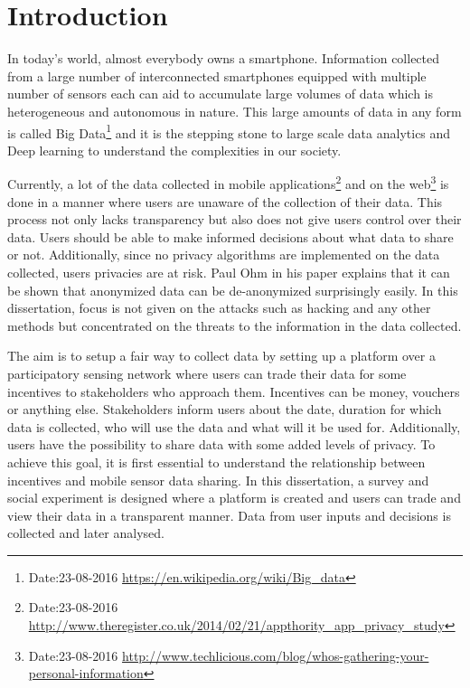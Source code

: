 \chapter{Introduction}

In today's world, almost everybody owns a smartphone. Information collected from a large number of interconnected smartphones equipped with
multiple number of sensors each can aid to accumulate large volumes of data which is heterogeneous and autonomous in nature. This large amounts of data in any form is called Big Data\footnote{Date:23-08-2016 \url{https://en.wikipedia.org/wiki/Big\_data}} and it
is the stepping stone to large scale data analytics and Deep learning to understand the complexities in our society. 

Currently, a lot of the data collected in mobile applications\footnote{Date:23-08-2016 \url{http://www.theregister.co.uk/2014/02/21/appthority\_app_privacy\_study}} and on the web\footnote{Date:23-08-2016 \url{http://www.techlicious.com/blog/whos-gathering-your-personal-information}}
is done in a manner where users are unaware of the collection of their data. This process not only lacks transparency but also does not give users
control over their data. Users should be able to make informed decisions about what data to share or not. Additionally, since no privacy algorithms 
are implemented on the data collected, users privacies are at risk. Paul Ohm in his paper \cite{ohm2010broken} explains that it can be shown that anonymized data can be de-anonymized surprisingly easily. In this dissertation, focus is not given on the attacks such as hacking and any other methods but concentrated on the threats to the information in the data collected.

The aim is to setup a fair way to collect data by setting up a platform over a participatory sensing network where users can trade their data for some incentives to stakeholders who approach them.
Incentives can be money, vouchers or anything else. Stakeholders inform users about the date, duration for which data is collected, who will use the data and what will it be used for. Additionally, users have the possibility to share data with some added levels of privacy. 
To achieve this goal, it is first essential to understand the relationship between incentives and mobile sensor data sharing. In this dissertation, a survey and social experiment is designed where a platform is created and users can trade and view their data in a transparent manner. Data from user inputs and decisions is collected and later analysed.






